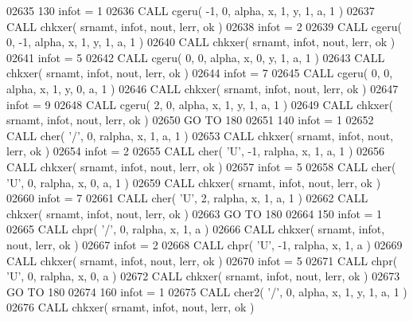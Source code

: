 \begin{DoxyCode}
02635   130 infot = 1
02636       \textcolor{keyword}{CALL }cgeru( -1, 0, alpha, x, 1, y, 1, a, 1 )
02637       \textcolor{keyword}{CALL }chkxer( srnamt, infot, nout, lerr, ok )
02638       infot = 2
02639       \textcolor{keyword}{CALL }cgeru( 0, -1, alpha, x, 1, y, 1, a, 1 )
02640       \textcolor{keyword}{CALL }chkxer( srnamt, infot, nout, lerr, ok )
02641       infot = 5
02642       \textcolor{keyword}{CALL }cgeru( 0, 0, alpha, x, 0, y, 1, a, 1 )
02643       \textcolor{keyword}{CALL }chkxer( srnamt, infot, nout, lerr, ok )
02644       infot = 7
02645       \textcolor{keyword}{CALL }cgeru( 0, 0, alpha, x, 1, y, 0, a, 1 )
02646       \textcolor{keyword}{CALL }chkxer( srnamt, infot, nout, lerr, ok )
02647       infot = 9
02648       \textcolor{keyword}{CALL }cgeru( 2, 0, alpha, x, 1, y, 1, a, 1 )
02649       \textcolor{keyword}{CALL }chkxer( srnamt, infot, nout, lerr, ok )
02650       \textcolor{keywordflow}{GO TO} 180
02651   140 infot = 1
02652       \textcolor{keyword}{CALL }cher( \textcolor{stringliteral}{'/'}, 0, ralpha, x, 1, a, 1 )
02653       \textcolor{keyword}{CALL }chkxer( srnamt, infot, nout, lerr, ok )
02654       infot = 2
02655       \textcolor{keyword}{CALL }cher( \textcolor{stringliteral}{'U'}, -1, ralpha, x, 1, a, 1 )
02656       \textcolor{keyword}{CALL }chkxer( srnamt, infot, nout, lerr, ok )
02657       infot = 5
02658       \textcolor{keyword}{CALL }cher( \textcolor{stringliteral}{'U'}, 0, ralpha, x, 0, a, 1 )
02659       \textcolor{keyword}{CALL }chkxer( srnamt, infot, nout, lerr, ok )
02660       infot = 7
02661       \textcolor{keyword}{CALL }cher( \textcolor{stringliteral}{'U'}, 2, ralpha, x, 1, a, 1 )
02662       \textcolor{keyword}{CALL }chkxer( srnamt, infot, nout, lerr, ok )
02663       \textcolor{keywordflow}{GO TO} 180
02664   150 infot = 1
02665       \textcolor{keyword}{CALL }chpr( \textcolor{stringliteral}{'/'}, 0, ralpha, x, 1, a )
02666       \textcolor{keyword}{CALL }chkxer( srnamt, infot, nout, lerr, ok )
02667       infot = 2
02668       \textcolor{keyword}{CALL }chpr( \textcolor{stringliteral}{'U'}, -1, ralpha, x, 1, a )
02669       \textcolor{keyword}{CALL }chkxer( srnamt, infot, nout, lerr, ok )
02670       infot = 5
02671       \textcolor{keyword}{CALL }chpr( \textcolor{stringliteral}{'U'}, 0, ralpha, x, 0, a )
02672       \textcolor{keyword}{CALL }chkxer( srnamt, infot, nout, lerr, ok )
02673       \textcolor{keywordflow}{GO TO} 180
02674   160 infot = 1
02675       \textcolor{keyword}{CALL }cher2( \textcolor{stringliteral}{'/'}, 0, alpha, x, 1, y, 1, a, 1 )
02676       \textcolor{keyword}{CALL }chkxer( srnamt, infot, nout, lerr, ok )

\end{DoxyCode}
